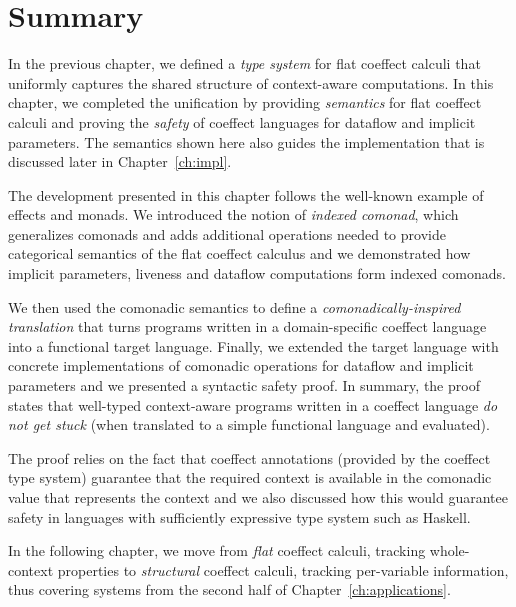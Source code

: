 \section{Summary}

In the previous chapter, we defined a \emph{type system} for flat coeffect calculi that uniformly
captures the shared structure of context-aware computations. In this chapter, we completed
the unification by providing \emph{semantics} for flat coeffect calculi and proving the
\emph{safety} of coeffect languages for dataflow and implicit parameters. The semantics shown
here also guides the implementation that is discussed later in Chapter~\ref{ch:impl}.

The development presented in this chapter follows the well-known example of effects and monads.
We introduced the notion of \emph{indexed comonad}, which generalizes comonads
and adds additional operations needed to provide categorical semantics of the flat coeffect
calculus and we demonstrated how implicit parameters, liveness and dataflow computations form
indexed comonads.

We then used the comonadic semantics to define a \emph{comonadically-inspired translation}
that turns programs written in a domain-specific coeffect language into a functional target
language. Finally, we extended the target
language with concrete implementations of comonadic operations for dataflow and implicit parameters
and we presented a syntactic safety proof. In summary, the proof states that well-typed
context-aware programs written in a coeffect language \emph{do not get stuck} (when translated
to a simple functional language and evaluated).

The proof relies on the fact that coeffect annotations (provided by the coeffect type system)
guarantee that the required context is available in the comonadic value that represents the
context and we also discussed how this would guarantee safety in languages with sufficiently
expressive type system such as Haskell.

In the following chapter, we move from \emph{flat} coeffect calculi, tracking whole-context
properties to \emph{structural} coeffect calculi, tracking per-variable information, thus
covering systems from the second half of Chapter~\ref{ch:applications}.

